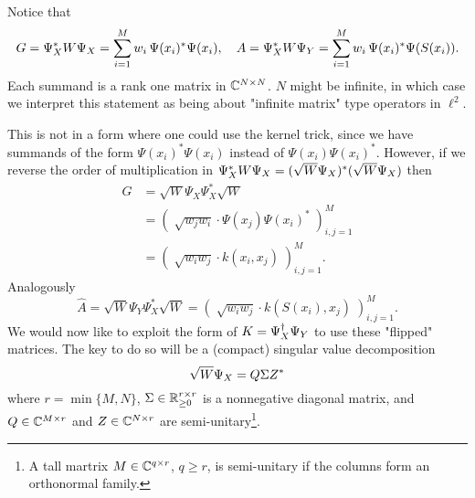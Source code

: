 Notice that 
\begin{equation}
    G = \Psi_X^* W \Psi_X = \sum_{i=1}^{M} w_i\, \Psi (x_i)^* \Psi (x_i), \quad
    A = \Psi_X^* W \Psi_Y = \sum_{i=1}^{M} w_i\, \Psi (x_i)^* \Psi (S(x_i)) . 
\end{equation}
Each summand is a rank one matrix in $\mathbb{C}^{N \times N}$. $N$ might be infinite, in which 
case we interpret this statement as being about "infinite matrix" type operators in $\ell^2$. 

This is not in a form where one could use the kernel trick, since we have summands of the 
form $\Psi (x_i)^* \Psi (x_i)$ instead of $\Psi (x_i) \Psi (x_i)^*$. However, if we 
reverse the order of multiplication in $\Psi_X^* W \Psi_X = (\sqrt{W} \Psi_X)^* (\sqrt{W} \Psi_X)$ 
then 
\begin{equation}
    \label{eq:G_hat}
    \begin{split}
        \widehat{G} &= \sqrt{W} \Psi_X \Psi_X^* \sqrt{W} \\
        &= \left(\; \sqrt{w_j w_i} \cdot \Psi (x_j) \Psi (x_i)^* \;\right)_{i, j=1}^M \\
        &= \left(\; \sqrt{w_i w_j} \cdot k(x_i, x_j) \;\right)_{i, j=1}^M . 
    \end{split}
\end{equation}
Analogously 
\begin{equation}
    \label{eq:A_hat}
    \widehat{A} = \sqrt{W} \Psi_Y \Psi_X^* \sqrt{W}
    = \left(\; \sqrt{w_i w_j} \cdot k(S(x_i), x_j) \;\right)_{i, j=1}^M . 
\end{equation}
We would now like to exploit the form of $K = \Psi_X^\dagger \Psi_Y$ 
to use these "flipped" matrices. The key to do so will be a (compact) singular value 
decomposition
\begin{equation}
    \label{eq:psi_x_svd}
    \sqrt{W} \Psi_X = Q \Sigma Z^*
\end{equation}
where $r = \min\{M, N\}$, $\Sigma \in \mathbb{R}_{\geq 0}^{r \times r}$ is a nonnegative diagonal 
matrix, and $Q \in \mathbb{C}^{M \times r}$ and $Z \in \mathbb{C}^{N \times r}$ are semi-unitary\footnote{
    A tall martrix $M \in \mathbb{C}^{q \times r}$, $q \geq r$, is semi-unitary if the columns 
    form an orthonormal family. 
}. 

